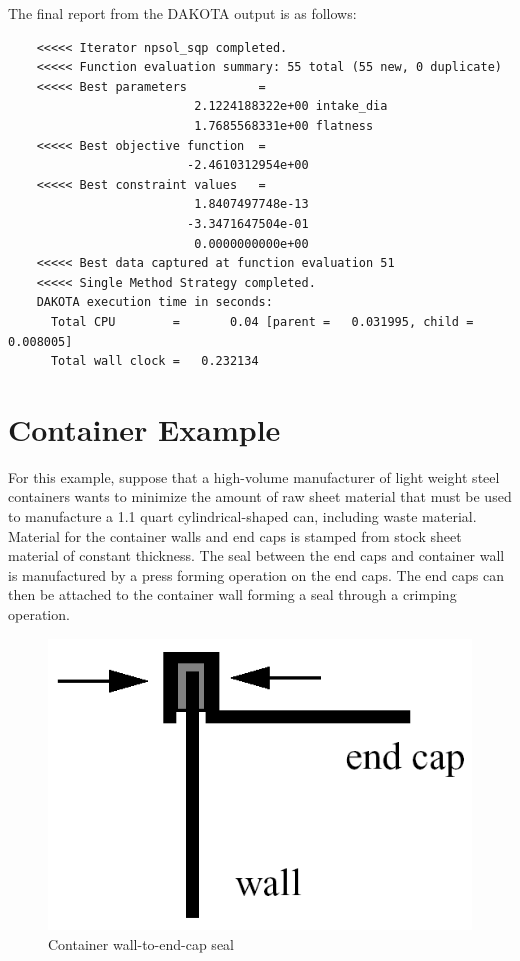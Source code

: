 The final report from the DAKOTA output is as follows:
\begin{small}
\begin{verbatim}
    <<<<< Iterator npsol_sqp completed.					 
    <<<<< Function evaluation summary: 55 total (55 new, 0 duplicate)	 
    <<<<< Best parameters          =					 
                          2.1224188322e+00 intake_dia			 
                          1.7685568331e+00 flatness
    <<<<< Best objective function  =					 
                         -2.4610312954e+00
    <<<<< Best constraint values   =		 
                          1.8407497748e-13
                         -3.3471647504e-01
                          0.0000000000e+00
    <<<<< Best data captured at function evaluation 51
    <<<<< Single Method Strategy completed.
    DAKOTA execution time in seconds:					 
      Total CPU        =       0.04 [parent =   0.031995, child =   0.008005]
      Total wall clock =   0.232134
\end{verbatim}
\end{small}

\section{Container Example}\label{additional:container}

For this example, suppose that a high-volume manufacturer of light
weight steel containers wants to minimize the amount of raw sheet
material that must be used to manufacture a 1.1 quart
cylindrical-shaped can, including waste material. Material for the
container walls and end caps is stamped from stock sheet material of
constant thickness. The seal between the end caps and container wall
is manufactured by a press forming operation on the end caps. The end
caps can then be attached to the container wall forming a seal through
a crimping operation.
\begin{figure}
  \centering
  \includegraphics[scale=0.4]{images/end_cap}
  \caption{Container wall-to-end-cap seal}
  \label{additional:figure01}
\end{figure}

